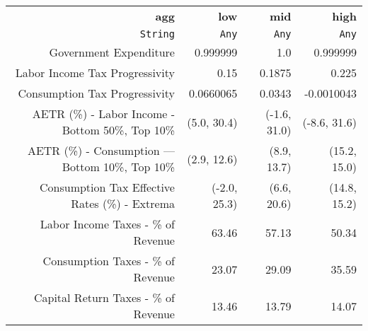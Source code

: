\begin{tabular}{rrrr}
  \hline
  \textbf{agg} & \textbf{low} & \textbf{mid} & \textbf{high} \\
  \texttt{String} & \texttt{Any} & \texttt{Any} & \texttt{Any} \\\hline
  Government Expenditure & 0.999999 & 1.0 & 0.999999 \\
  Labor Income Tax Progressivity & 0.15 & 0.1875 & 0.225 \\
  Consumption Tax Progressivity & 0.0660065 & 0.0343 & -0.0010043 \\
  AETR (\%) - Labor Income - Bottom 50\%, Top 10\% & (5.0, 30.4) & (-1.6, 31.0) & (-8.6, 31.6) \\
  AETR (\%) - Consumption — Bottom 10\%, Top 10\% & (2.9, 12.6) & (8.9, 13.7) & (15.2, 15.0) \\
  Consumption Tax Effective Rates (\%) - Extrema & (-2.0, 25.3) & (6.6, 20.6) & (14.8, 15.2) \\
  Labor Income Taxes - \% of Revenue & 63.46 & 57.13 & 50.34 \\
  Consumption Taxes - \% of Revenue & 23.07 & 29.09 & 35.59 \\
  Capital Return Taxes - \% of Revenue & 13.46 & 13.79 & 14.07 \\\hline
\end{tabular}
